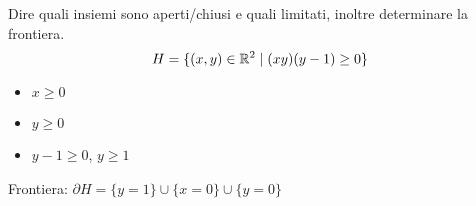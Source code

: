\begin{eexercise}
  Dire quali insiemi sono aperti/chiusi e quali limitati, inoltre determinare la frontiera.
  $$H=\{(x,y)\in \mathbb{R}^2 \mid (xy)(y-1)\geq 0\}$$
  \begin{itemize}
    \item $x\geq 0$
    \item $y\geq 0$
    \item $y-1\geq 0$, $y\geq 1$
  \end{itemize}
  Frontiera: $\partial H = \{y=1\} \cup \{x=0\} \cup \{y=0\}$
\end{eexercise}